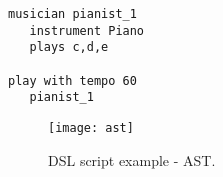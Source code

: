 \begin{lstlisting}[caption={DSL script example.}, label=LS_DSL_WALK]
musician pianist_1
   instrument Piano
   plays c,d,e

play with tempo 60
   pianist_1
\end{lstlisting}

\begin{figure}[h]
\caption{DSL script example - AST.}
\label{IMG_DSL_AST}
\texttt{[image: ast]}
\end{figure}



